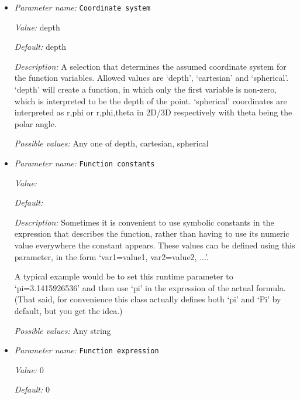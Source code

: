 \begin{itemize}
\item {\it Parameter name:} {\tt Coordinate system}
\label{parameters:Mesh refinement/Maximum refinement function/Coordinate system}


{\it Value:} depth


{\it Default:} depth


{\it Description:} A selection that determines the assumed coordinate system for the function variables. Allowed values are `depth', `cartesian' and `spherical'. `depth' will create a function, in which only the first variable is non-zero, which is interpreted to be the depth of the point. `spherical' coordinates are interpreted as r,phi or r,phi,theta in 2D/3D respectively with theta being the polar angle.


{\it Possible values:} Any one of depth, cartesian, spherical
\item {\it Parameter name:} {\tt Function constants}
\label{parameters:Mesh refinement/Maximum refinement function/Function constants}


{\it Value:} 


{\it Default:} 


{\it Description:} Sometimes it is convenient to use symbolic constants in the expression that describes the function, rather than having to use its numeric value everywhere the constant appears. These values can be defined using this parameter, in the form `var1=value1, var2=value2, ...'.

A typical example would be to set this runtime parameter to `pi=3.1415926536' and then use `pi' in the expression of the actual formula. (That said, for convenience this class actually defines both `pi' and `Pi' by default, but you get the idea.)


{\it Possible values:} Any string
\item {\it Parameter name:} {\tt Function expression}
\label{parameters:Mesh refinement/Maximum refinement function/Function expression}


{\it Value:} 0


{\it Default:} 0



\end{itemize}
